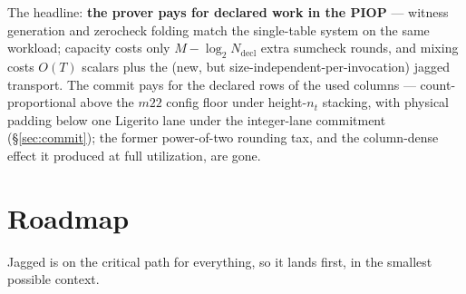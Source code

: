 \documentclass[11pt]{article}
\theoremstyle{definition}
\begin{document}
The headline: \textbf{the prover pays for declared work in the PIOP} ---
witness generation and zerocheck folding match the single-table system on
the same workload; capacity costs only $M - \log_2 N_{\mathrm{decl}}$
extra sumcheck rounds, and mixing costs $O(T)$ scalars plus the (new, but
size-independent-per-invocation) jagged transport. The commit pays for
the declared rows of the used columns --- count-proportional above the
$m22$ config floor under height-$n_t$ stacking, with physical padding
below one Ligerito lane under the integer-lane commitment
(\S\ref{sec:commit}); the former power-of-two rounding tax, and the
column-dense effect it produced at full utilization, are gone.

\section{Roadmap}\label{sec:roadmap}

Jagged is on the critical path for everything, so it lands first, in the
smallest possible context.
\end{document}
